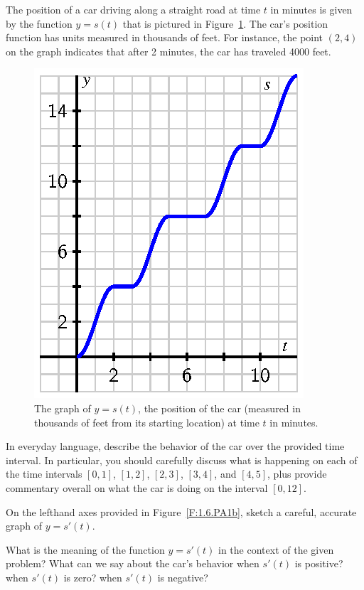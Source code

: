 \begin{pa} \label{PA:1.6}
The position of a car driving along a straight road at time $t$ in minutes is given by the function $y = s(t)$ that is pictured in Figure~\ref{F:1.6.PA1}.  The car's position function has units measured in thousands of feet.  For instance, the point $(2,4)$ on the graph indicates that after 2 minutes, the car has traveled 4000 feet.
\begin{figure}[h]
\begin{center}
\includegraphics{figures/1_6_PA1.eps}
\caption{The graph of $y = s(t)$, the position of the car (measured in thousands of feet from its starting location) at time $t$ in minutes.} \label{F:1.6.PA1}
\end{center}
\end{figure}
\ba
	\item In everyday language, describe the behavior of the car over the provided time interval.  In particular, you should carefully discuss what is happening on each of the time intervals $[0,1]$, $[1,2]$, $[2,3]$, $[3,4]$, and $[4,5]$, plus provide commentary overall on what the car is doing on the interval $[0,12]$.
	\item On the lefthand axes provided in Figure~\ref{F:1.6.PA1b}, sketch a careful, accurate graph of $y = s'(t)$.
	\item What is the meaning of the function $y = s'(t)$ in the context of the given problem?  What can we say about the car's behavior when $s'(t)$ is positive?  when $s'(t)$ is zero?  when $s'(t)$ is negative?

\end{pa}
